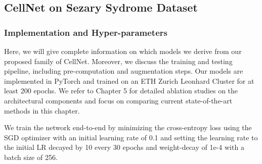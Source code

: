 \subsection{CellNet on Sezary Sydrome Dataset}

\subsubsection{Implementation and Hyper-parameters}
Here, we will give complete information on which models we derive from our proposed family of CellNet. Moreover, we discuss the training and testing pipeline, including pre-computation and augmentation steps. Our models are implemented in PyTorch and trained on an ETH Zurich Leonhard Cluster for at least 200 epochs. We refer to Chapter 5 for detailed ablation studies on the architectural components and focus on comparing current state-of-the-art methods in this chapter.

We train the network end-to-end by minimizing the cross-entropy loss using the SGD optimizer with an initial learning rate of 0.1 and setting the learning rate to the initial LR decayed by 10 every 30 epochs and weight-decay of 1e-4  with a batch size of 256.

